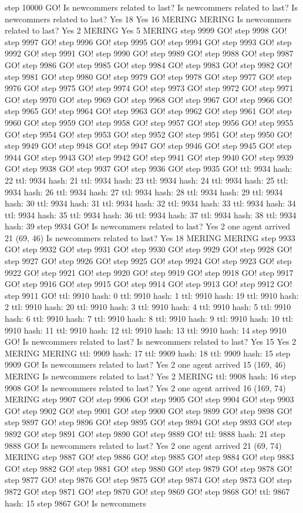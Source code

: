 step 10000 GO! Is newcommers related to last? Is newcommers related to last? Is newcommers related to last? Yes 18 Yes 16 MERING MERING Is newcommers related to last? Yes 2 MERING Yes 5 MERING step 9999 GO! step 9998 GO! step 9997 GO! step 9996 GO! step 9995 GO! step 9994 GO! step 9993 GO! step 9992 GO! step 9991 GO! step 9990 GO! step 9989 GO! step 9988 GO! step 9987 GO! step 9986 GO! step 9985 GO! step 9984 GO! step 9983 GO! step 9982 GO! step 9981 GO! step 9980 GO! step 9979 GO! step 9978 GO! step 9977 GO! step 9976 GO! step 9975 GO! step 9974 GO! step 9973 GO! step 9972 GO! step 9971 GO! step 9970 GO! step 9969 GO! step 9968 GO! step 9967 GO! step 9966 GO! step 9965 GO! step 9964 GO! step 9963 GO! step 9962 GO! step 9961 GO! step 9960 GO! step 9959 GO! step 9958 GO! step 9957 GO! step 9956 GO! step 9955 GO! step 9954 GO! step 9953 GO! step 9952 GO! step 9951 GO! step 9950 GO! step 9949 GO! step 9948 GO! step 9947 GO! step 9946 GO! step 9945 GO! step 9944 GO! step 9943 GO! step 9942 GO! step 9941 GO! step 9940 GO! step 9939 GO! step 9938 GO! step 9937 GO! step 9936 GO! step 9935 GO! ttl: 9934 hash: 22 ttl: 9934 hash: 21 ttl: 9934 hash: 23 ttl: 9934 hash: 24 ttl: 9934 hash: 25 ttl: 9934 hash: 26 ttl: 9934 hash: 27 ttl: 9934 hash: 28 ttl: 9934 hash: 29 ttl: 9934 hash: 30 ttl: 9934 hash: 31 ttl: 9934 hash: 32 ttl: 9934 hash: 33 ttl: 9934 hash: 34 ttl: 9934 hash: 35 ttl: 9934 hash: 36 ttl: 9934 hash: 37 ttl: 9934 hash: 38 ttl: 9934 hash: 39 step 9934 GO! Is newcommers related to last? Yes 2 one agent arrived 21 (69, 46) Is newcommers related to last? Yes 18 MERING MERING step 9933 GO! step 9932 GO! step 9931 GO! step 9930 GO! step 9929 GO! step 9928 GO! step 9927 GO! step 9926 GO! step 9925 GO! step 9924 GO! step 9923 GO! step 9922 GO! step 9921 GO! step 9920 GO! step 9919 GO! step 9918 GO! step 9917 GO! step 9916 GO! step 9915 GO! step 9914 GO! step 9913 GO! step 9912 GO! step 9911 GO! ttl: 9910 hash: 0 ttl: 9910 hash: 1 ttl: 9910 hash: 19 ttl: 9910 hash: 2 ttl: 9910 hash: 20 ttl: 9910 hash: 3 ttl: 9910 hash: 4 ttl: 9910 hash: 5 ttl: 9910 hash: 6 ttl: 9910 hash: 7 ttl: 9910 hash: 8 ttl: 9910 hash: 9 ttl: 9910 hash: 10 ttl: 9910 hash: 11 ttl: 9910 hash: 12 ttl: 9910 hash: 13 ttl: 9910 hash: 14 step 9910 GO! Is newcommers related to last? Is newcommers related to last? Yes 15 Yes 2 MERING MERING ttl: 9909 hash: 17 ttl: 9909 hash: 18 ttl: 9909 hash: 15 step 9909 GO! Is newcommers related to last? Yes 2 one agent arrived 15 (169, 46) MERING Is newcommers related to last? Yes 2 MERING ttl: 9908 hash: 16 step 9908 GO! Is newcommers related to last? Yes 2 one agent arrived 16 (169, 74) MERING step 9907 GO! step 9906 GO! step 9905 GO! step 9904 GO! step 9903 GO! step 9902 GO! step 9901 GO! step 9900 GO! step 9899 GO! step 9898 GO! step 9897 GO! step 9896 GO! step 9895 GO! step 9894 GO! step 9893 GO! step 9892 GO! step 9891 GO! step 9890 GO! step 9889 GO! ttl: 9888 hash: 21 step 9888 GO! Is newcommers related to last? Yes 2 one agent arrived 21 (69, 74) MERING step 9887 GO! step 9886 GO! step 9885 GO! step 9884 GO! step 9883 GO! step 9882 GO! step 9881 GO! step 9880 GO! step 9879 GO! step 9878 GO! step 9877 GO! step 9876 GO! step 9875 GO! step 9874 GO! step 9873 GO! step 9872 GO! step 9871 GO! step 9870 GO! step 9869 GO! step 9868 GO! ttl: 9867 hash: 15 step 9867 GO! Is newcommers 